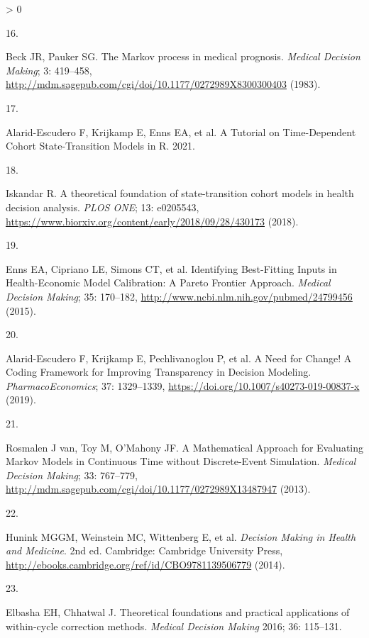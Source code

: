 \documentclass[
]{article}
\newlength{\cslhangindent}
\newlength{\csllabelwidth}
\newenvironment{CSLReferences}[2] %
 {%
  \setlength{\parindent}{0pt}
  \ifodd #1 \everypar{\setlength{\hangindent}{\cslhangindent}}\ignorespaces\fi
  \ifnum #2 > 0
  \setlength{\parskip}{#2\baselineskip}
  \fi
 }%
 {}
\newcommand{\CSLLeftMargin}[1]{\parbox[t]{\csllabelwidth}{#1}}
\newcommand{\CSLRightInline}[1]{\parbox[t]{\linewidth - \csllabelwidth}{#1}\break}
\begin{document}
\begin{CSLReferences}{0}{0}
\leavevmode\hypertarget{ref-Beck1983}{}%
\CSLLeftMargin{16. }
\CSLRightInline{Beck JR, Pauker SG. {The Markov process in medical prognosis}. \emph{Medical Decision Making}; 3: 419--458, \url{http://mdm.sagepub.com/cgi/doi/10.1177/0272989X8300300403} (1983).}

\leavevmode\hypertarget{ref-Alarid-Escudero2021b}{}%
\CSLLeftMargin{17. }
\CSLRightInline{Alarid-Escudero F, Krijkamp E, Enns EA, et al. {A Tutorial on Time-Dependent Cohort State-Transition Models in R}. 2021.}

\leavevmode\hypertarget{ref-Iskandar2018a}{}%
\CSLLeftMargin{18. }
\CSLRightInline{Iskandar R. {A theoretical foundation of state-transition cohort models in health decision analysis}. \emph{PLOS ONE}; 13: e0205543, \url{https://www.biorxiv.org/content/early/2018/09/28/430173} (2018).}

\leavevmode\hypertarget{ref-Enns2015e}{}%
\CSLLeftMargin{19. }
\CSLRightInline{Enns EA, Cipriano LE, Simons CT, et al. {Identifying Best-Fitting Inputs in Health-Economic Model Calibration: A Pareto Frontier Approach}. \emph{Medical Decision Making}; 35: 170--182, \url{http://www.ncbi.nlm.nih.gov/pubmed/24799456} (2015).}

\leavevmode\hypertarget{ref-Alarid-Escudero2019e}{}%
\CSLLeftMargin{20. }
\CSLRightInline{Alarid-Escudero F, Krijkamp E, Pechlivanoglou P, et al. {A Need for Change! A Coding Framework for Improving Transparency in Decision Modeling}. \emph{PharmacoEconomics}; 37: 1329--1339, \url{https://doi.org/10.1007/s40273-019-00837-x} (2019).}

\leavevmode\hypertarget{ref-VanRosmalen2013}{}%
\CSLLeftMargin{21. }
\CSLRightInline{Rosmalen J van, Toy M, O'Mahony JF. {A Mathematical Approach for Evaluating Markov Models in Continuous Time without Discrete-Event Simulation}. \emph{Medical Decision Making}; 33: 767--779, \url{http://mdm.sagepub.com/cgi/doi/10.1177/0272989X13487947} (2013).}

\leavevmode\hypertarget{ref-Hunink2014}{}%
\CSLLeftMargin{22. }
\CSLRightInline{Hunink MGGM, Weinstein MC, Wittenberg E, et al. \emph{{Decision Making in Health and Medicine}}. 2nd ed. Cambridge: Cambridge University Press, \url{http://ebooks.cambridge.org/ref/id/CBO9781139506779} (2014).}

\leavevmode\hypertarget{ref-Elbasha2016}{}%
\CSLLeftMargin{23. }
\CSLRightInline{Elbasha EH, Chhatwal J. {Theoretical foundations and practical applications of within-cycle correction methods}. \emph{Medical Decision Making} 2016; 36: 115--131.}


\end{CSLReferences}
\end{document}
